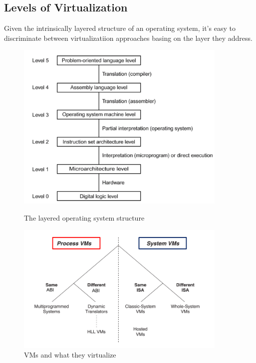 \documentclass[10pt,a4paper]{article}
\begin{document}
			\subsection{Levels of Virtualization}
				Given the intrinsically layered structure of an operating system, it's easy to discriminate between virtualizatiion approaches basing on the layer they address.
				\begin{figure}[H]
					\centering
					\begin{minipage}{0.45\textwidth}
						\centering
						\includegraphics[width=0.9\textwidth]{./images/layers.png}
						\caption{The layered operating system structure}
					\end{minipage}\hfill
					\begin{minipage}{0.45\textwidth}
						\centering
						\includegraphics[width=0.9\textwidth]{./images/vms.png}
						\caption{VMs and what they virtualize}
					\end{minipage}
				\end{figure}
				
\end{document}
